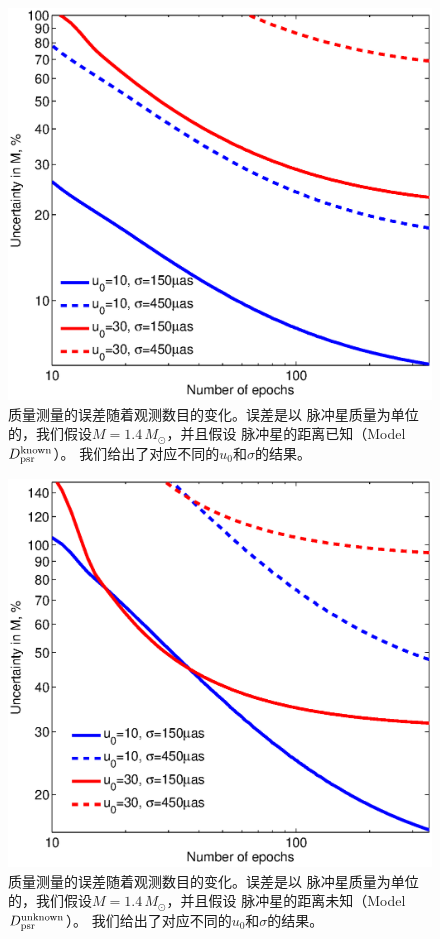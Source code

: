 %
\begin{figure}
\begin{center}
  \includegraphics[width=4 in,trim=0 0 0 3.2cm]{mass_6.eps}
%
\caption{质量测量的误差随着观测数目的变化。误差是以
脉冲星质量为单位的，我们假设$M=1.4$\,$M_{\odot}$，并且假设
脉冲星的距离已知（Model $D_{\rm{psr}}^{\rm{known}}$）。
我们给出了对应不同的$u_0$和$\sigma$的结果。
}
\label{mass_6}
\end{center}
\end{figure}
%
%
\begin{figure}
\begin{center}
  \includegraphics[width=4 in,trim=0 0 0 3.2cm]{mass_7.eps}
%
\caption{质量测量的误差随着观测数目的变化。误差是以
脉冲星质量为单位的，我们假设$M=1.4$\,$M_{\odot}$，并且假设
脉冲星的距离未知（Model $D_{\rm{psr}}^{\rm{unknown}}$）。
我们给出了对应不同的$u_0$和$\sigma$的结果。
}
\label{mass_7}
\end{center}
\end{figure}

